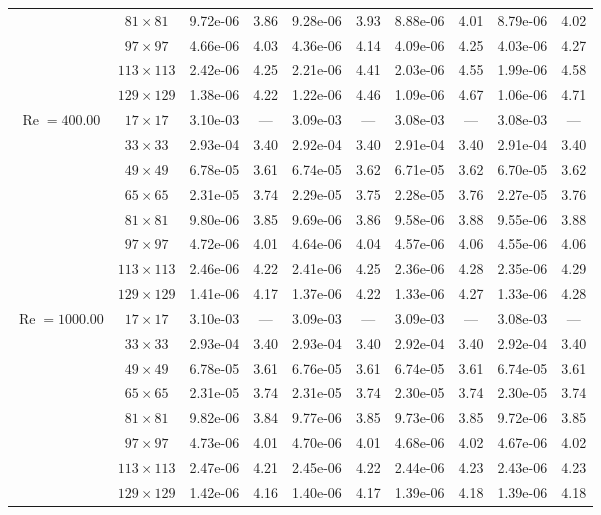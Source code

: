 \documentclass[preprint, 12pt]{elsarticle}
\begin{document}
\begin{center}
\begin{table}[H]
{\begin{tabular*}{\textwidth}{@{\extracolsep\fill}cccccccccc@{}}
    & $81\times 81$ & 9.72e-06 & 3.86 & 9.28e-06 & 3.93 & 8.88e-06 & 4.01 & 8.79e-06 & 4.02 \\
    & $97\times 97$ & 4.66e-06 & 4.03 & 4.36e-06 & 4.14 & 4.09e-06 & 4.25 & 4.03e-06 & 4.27 \\
    & $113\times 113$ & 2.42e-06 & 4.25 & 2.21e-06 & 4.41 & 2.03e-06 & 4.55 & 1.99e-06 & 4.58 \\
    & $129\times 129$ & 1.38e-06 & 4.22 & 1.22e-06 & 4.46 & 1.09e-06 & 4.67 & 1.06e-06 & 4.71 \\
    \hline
    \multirow{7}{*}{$\operatorname{Re}=400.00$} & $17\times 17$ & 3.10e-03 & --- & 3.09e-03 & --- & 3.08e-03 & --- & 3.08e-03 & --- \\
    & $33\times 33$ & 2.93e-04 & 3.40 & 2.92e-04 & 3.40 & 2.91e-04 & 3.40 & 2.91e-04 & 3.40 \\
    & $49\times 49$ & 6.78e-05 & 3.61 & 6.74e-05 & 3.62 & 6.71e-05 & 3.62 & 6.70e-05 & 3.62 \\
    \multirow{3}{*}{$\operatorname{Wi}=10$} & $65\times 65$ & 2.31e-05 & 3.74 & 2.29e-05 & 3.75 & 2.28e-05 & 3.76 & 2.27e-05 & 3.76 \\
    & $81\times 81$ & 9.80e-06 & 3.85 & 9.69e-06 & 3.86 & 9.58e-06 & 3.88 & 9.55e-06 & 3.88 \\
    & $97\times 97$ & 4.72e-06 & 4.01 & 4.64e-06 & 4.04 & 4.57e-06 & 4.06 & 4.55e-06 & 4.06 \\
    & $113\times 113$ & 2.46e-06 & 4.22 & 2.41e-06 & 4.25 & 2.36e-06 & 4.28 & 2.35e-06 & 4.29 \\
    & $129\times 129$ & 1.41e-06 & 4.17 & 1.37e-06 & 4.22 & 1.33e-06 & 4.27 & 1.33e-06 & 4.28 \\
    \hline
    \multirow{7}{*}{$\operatorname{Re}=1000.00$} & $17\times 17$ & 3.10e-03 & --- & 3.09e-03 & --- & 3.09e-03 & --- & 3.08e-03 & --- \\
    & $33\times 33$ & 2.93e-04 & 3.40 & 2.93e-04 & 3.40 & 2.92e-04 & 3.40 & 2.92e-04 & 3.40 \\
    & $49\times 49$ & 6.78e-05 & 3.61 & 6.76e-05 & 3.61 & 6.74e-05 & 3.61 & 6.74e-05 & 3.61 \\
    \multirow{3}{*}{$\operatorname{Wi}=10$} & $65\times 65$ & 2.31e-05 & 3.74 & 2.31e-05 & 3.74 & 2.30e-05 & 3.74 & 2.30e-05 & 3.74 \\
    & $81\times 81$ & 9.82e-06 & 3.84 & 9.77e-06 & 3.85 & 9.73e-06 & 3.85 & 9.72e-06 & 3.85 \\
    & $97\times 97$ & 4.73e-06 & 4.01 & 4.70e-06 & 4.01 & 4.68e-06 & 4.02 & 4.67e-06 & 4.02 \\
    & $113\times 113$ & 2.47e-06 & 4.21 & 2.45e-06 & 4.22 & 2.44e-06 & 4.23 & 2.43e-06 & 4.23 \\
    & $129\times 129$ & 1.42e-06 & 4.16 & 1.40e-06 & 4.17 & 1.39e-06 & 4.18 & 1.39e-06 & 4.18 \\
    \hline
    \end{tabular*}
}
\end{table}
\end{center}
\end{document}
